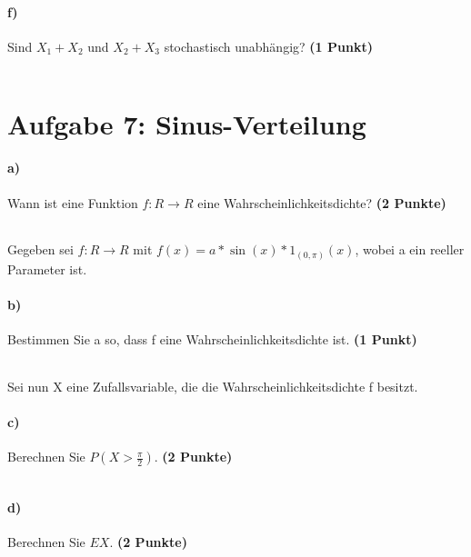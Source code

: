 \documentclass[10pt, a4paper]{article}
\begin{document}
\paragraph{f)} Sind $X_1+X_2$ und $X_2+X_3$ stochastisch unabhängig? \textbf{(1 Punkt)}\\
\begin{tabular}{| p{17cm} |}
    \hline
    \\\hline
\end{tabular}

\section{Aufgabe 7: Sinus-Verteilung}
\paragraph{a)} Wann ist eine Funktion $f:R\rightarrow R$ eine Wahrscheinlichkeitsdichte? \textbf{(2 Punkte)}\\
\begin{tabular}{| p{17cm} |}
    \hline
    \\\hline
\end{tabular}

Gegeben sei $f:R\rightarrow R$ mit $f(x) =a*\sin(x)*1_{(0,\pi)}(x)$, wobei a ein reeller Parameter ist.
\paragraph{b)} Bestimmen Sie a so, dass f eine Wahrscheinlichkeitsdichte ist. \textbf{(1 Punkt)}\\
\begin{tabular}{| p{17cm} |}
    \hline
    \\\hline
\end{tabular}

Sei nun X eine Zufallsvariable, die die Wahrscheinlichkeitsdichte f besitzt.
\paragraph{c)} Berechnen Sie $P(X >\frac{\pi}{2})$. \textbf{(2 Punkte)}\\
\begin{tabular}{| p{17cm} |}
    \hline
    \\\hline
\end{tabular}

\paragraph{d)} Berechnen Sie $E X$. \textbf{(2 Punkte)}\\
\begin{tabular}{| p{17cm} |}
    \hline
    \\\hline
\end{tabular}
\end{document}
